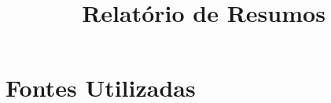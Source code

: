 \documentclass{article}%
\title{Relatório de Resumos}%
\begin{document}
%
\normalsize%
\maketitle%
\section{Fontes Utilizadas}%
\label{sec:FontesUtilizadas}%

%
\end{document}
